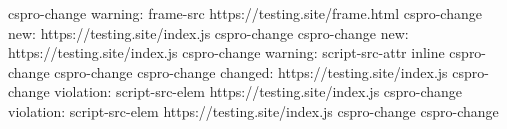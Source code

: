 cspro-change
warning:     frame-src    https://testing.site/frame.html
cspro-change
new:         https://testing.site/index.js
cspro-change
cspro-change
new:         https://testing.site/index.js
cspro-change
warning:     script-src-attr    inline
cspro-change
cspro-change
cspro-change
changed:     https://testing.site/index.js
cspro-change
violation:   script-src-elem    https://testing.site/index.js
cspro-change
violation:   script-src-elem    https://testing.site/index.js
cspro-change
cspro-change
